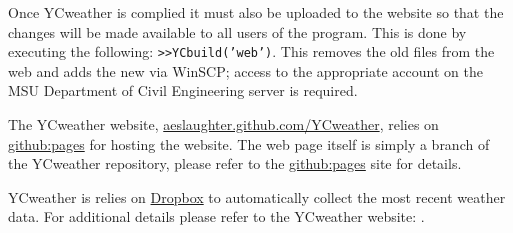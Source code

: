 Once YCweather is complied it must also be uploaded to the website so that the changes will be made available to all users of the program.  This is done by executing the following: \texttt{>>YCbuild('web')}.  This removes the old files from the web and adds the new via WinSCP; access to the appropriate account on the MSU Department of Civil Engineering server is required. 

\label{sec:web}
The YCweather website, \href{http://aeslaughter.github.com/YCweather/}{aeslaughter.github.com/YCweather}, relies on \href{http://pages.github.com}{github:pages} for hosting the website. The web page itself is simply a branch of the YCweather repository, please refer to the \href{http://pages.github.com}{github:pages} site for details.

YCweather is relies on \href{https://dropbox.com}{Dropbox} to automatically collect the most recent weather data. For additional details please refer to the YCweather website: .

